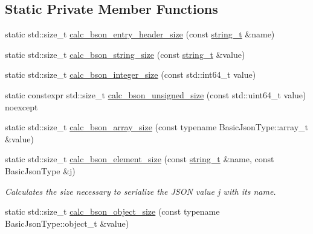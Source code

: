 \subsection*{Static Private Member Functions}
\begin{DoxyCompactItemize}
\item 
static std\+::size\+\_\+t \mbox{\hyperlink{classnlohmann_1_1detail_1_1binary__writer_a5bae2f1db2c511b869dffaddf15a1653}{calc\+\_\+bson\+\_\+entry\+\_\+header\+\_\+size}} (const \mbox{\hyperlink{classnlohmann_1_1detail_1_1binary__writer_a29f2ae7a5c4a8c1dae47b3b2310de8a8}{string\+\_\+t}} \&name)
\item 
static std\+::size\+\_\+t \mbox{\hyperlink{classnlohmann_1_1detail_1_1binary__writer_aea44fd97a5cb9b4f175e66e3e4fdf158}{calc\+\_\+bson\+\_\+string\+\_\+size}} (const \mbox{\hyperlink{classnlohmann_1_1detail_1_1binary__writer_a29f2ae7a5c4a8c1dae47b3b2310de8a8}{string\+\_\+t}} \&value)
\item 
static std\+::size\+\_\+t \mbox{\hyperlink{classnlohmann_1_1detail_1_1binary__writer_aeab70c895931b96ea598306b37eca271}{calc\+\_\+bson\+\_\+integer\+\_\+size}} (const std\+::int64\+\_\+t value)
\item 
static constexpr std\+::size\+\_\+t \mbox{\hyperlink{classnlohmann_1_1detail_1_1binary__writer_aa1d6bb9f3af16f07ce2440c354b5787b}{calc\+\_\+bson\+\_\+unsigned\+\_\+size}} (const std\+::uint64\+\_\+t value) noexcept
\item 
static std\+::size\+\_\+t \mbox{\hyperlink{classnlohmann_1_1detail_1_1binary__writer_af08f9302a02516ff8cf358a99aaa1ddf}{calc\+\_\+bson\+\_\+array\+\_\+size}} (const typename Basic\+Json\+Type\+::array\+\_\+t \&value)
\item 
static std\+::size\+\_\+t \mbox{\hyperlink{classnlohmann_1_1detail_1_1binary__writer_a1e4372c5984184eb5bcc09af1fcc2ee0}{calc\+\_\+bson\+\_\+element\+\_\+size}} (const \mbox{\hyperlink{classnlohmann_1_1detail_1_1binary__writer_a29f2ae7a5c4a8c1dae47b3b2310de8a8}{string\+\_\+t}} \&name, const Basic\+Json\+Type \&j)
\begin{DoxyCompactList}\small\item\em Calculates the size necessary to serialize the J\+S\+ON value {\itshape j} with its {\itshape name}. \end{DoxyCompactList}\item 
static std\+::size\+\_\+t \mbox{\hyperlink{classnlohmann_1_1detail_1_1binary__writer_acc6f1cc1fd370ee84ebc8cf7b8712840}{calc\+\_\+bson\+\_\+object\+\_\+size}} (const typename Basic\+Json\+Type\+::object\+\_\+t \&value)

\end{DoxyCompactItemize}
